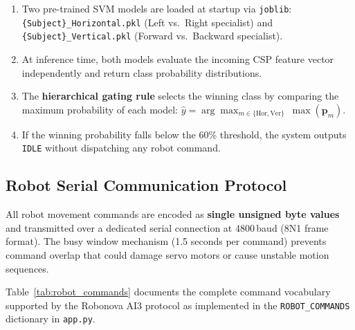 \documentclass[12pt, a4paper, oneside]{report}
\begin{document}
\begin{description}
\begin{enumerate}
  \item Two pre-trained SVM models are loaded at startup via \texttt{joblib}:
        \texttt{\{Subject\}\_Horizontal.pkl} (Left vs.\ Right specialist) and
        \texttt{\{Subject\}\_Vertical.pkl} (Forward vs.\ Backward specialist).
  \item At inference time, both models evaluate the incoming CSP feature vector
        independently and return class probability distributions.
  \item The \textbf{hierarchical gating rule} selects the winning class by comparing
        the maximum probability of each model:
        $\hat{y} = \arg\max_{m \in \{\text{Hor}, \text{Ver}\}}\ \max(\mathbf{p}_m)$.
  \item If the winning probability falls below the 60\% threshold, the system outputs
        \texttt{IDLE} without dispatching any robot command.
\end{enumerate}

\subsection{Robot Serial Communication Protocol}

All robot movement commands are encoded as \textbf{single unsigned byte values}
and transmitted over a dedicated serial connection at 4800\,baud (8N1 frame format).
The busy window mechanism (1.5 seconds per command) prevents command overlap that
could damage servo motors or cause unstable motion sequences.

Table~\ref{tab:robot_commands} documents the complete command vocabulary supported
by the Robonova AI3 protocol as implemented in the \texttt{ROBOT\_COMMANDS}
dictionary in \texttt{app.py}.


\end{description}
\end{document}
